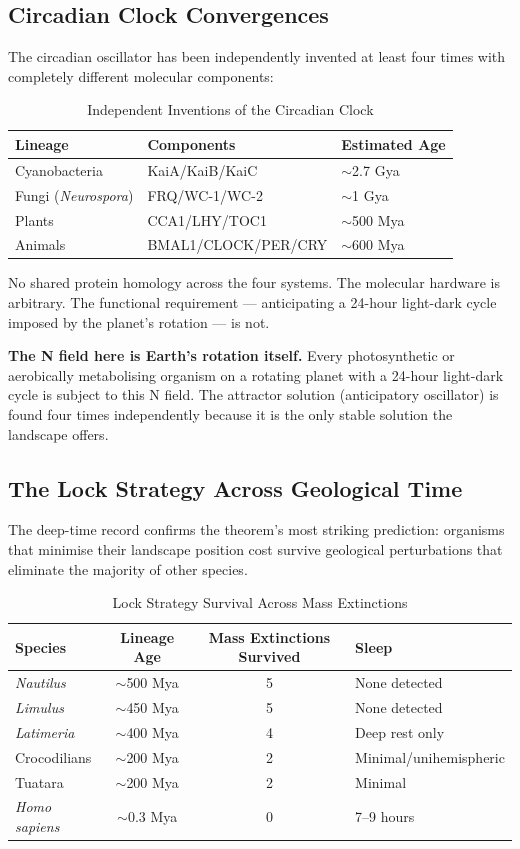 \documentclass[12pt, a4paper]{article}
\begin{document}
\subsection{Circadian Clock Convergences}

The circadian oscillator has been independently invented
at least four times with completely different molecular
components:

\begin{table}[h]
\centering
\caption{Independent Inventions of the Circadian Clock}
\begin{tabular}{lll}
\toprule
Lineage & Components & Estimated Age \\
\midrule
Cyanobacteria & KaiA/KaiB/KaiC & $\sim$2.7 Gya \\
Fungi (\textit{Neurospora}) & FRQ/WC-1/WC-2 & $\sim$1 Gya \\
Plants & CCA1/LHY/TOC1 & $\sim$500 Mya \\
Animals & BMAL1/CLOCK/PER/CRY & $\sim$600 Mya \\
\bottomrule
\end{tabular}
\end{table}

No shared protein homology across the four systems.
The molecular hardware is arbitrary. The functional
requirement --- anticipating a 24-hour light-dark cycle
imposed by the planet's rotation --- is not.

\textbf{The N field here is Earth's rotation itself.}
Every photosynthetic or aerobically metabolising organism
on a rotating planet with a 24-hour light-dark cycle is
subject to this N field. The attractor solution
(anticipatory oscillator) is found four times independently
because it is the only stable solution the landscape offers.

\subsection{The Lock Strategy Across Geological Time}

The deep-time record confirms the theorem's most striking
prediction: organisms that minimise their landscape
position cost survive geological perturbations that
eliminate the majority of other species.

\begin{table}[h]
\centering
\caption{Lock Strategy Survival Across Mass Extinctions}
\begin{tabular}{lccl}
\toprule
Species & Lineage Age & Mass Extinctions Survived & Sleep \\
\midrule
\textit{Nautilus} & $\sim$500 Mya & 5 & None detected \\
\textit{Limulus} & $\sim$450 Mya & 5 & None detected \\
\textit{Latimeria} & $\sim$400 Mya & 4 & Deep rest only \\
Crocodilians & $\sim$200 Mya & 2 & Minimal/unihemispheric \\
Tuatara & $\sim$200 Mya & 2 & Minimal \\
\textit{Homo sapiens} & $\sim$0.3 Mya & 0 & 7--9 hours \\
\bottomrule
\end{tabular}
\end{table}
\end{document}
